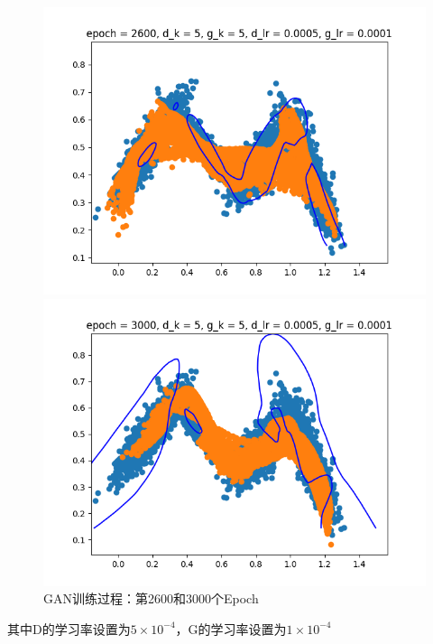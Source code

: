 \documentclass{article}
\begin{document}
\begin{figure}[H]
    \begin{minipage}[H]{0.5\linewidth}
        \centering
        \includegraphics[width=\textwidth]{figures/GAN_2600.png}
    \end{minipage}
    \begin{minipage}[H]{0.5\linewidth}
        \centering
        \includegraphics[width=\textwidth]{figures/GAN_3000.png}
    \end{minipage}
    \caption{GAN训练过程：第2600和3000个Epoch}
\end{figure}

其中D的学习率设置为$5 \times 10^{-4}$，G的学习率设置为$1 \times 10^{-4}$
\end{document}
